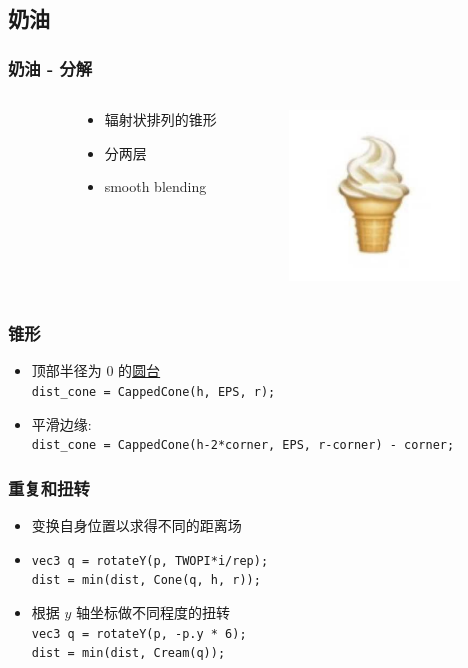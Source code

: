 \documentclass[aspectratio=169]{ctexbeamer} %
\begin{document}
\subsection{奶油}
\begin{frame}
    \frametitle{奶油 - 分解} %
    \begin{columns}
    \begin{column}{.1\textwidth}\end{column}
        \begin{column}{.4\textwidth}
            \begin{itemize}
                \item 辐射状排列的锥形
                \item 分两层
                \item smooth blending %
            \end{itemize}
        \end{column}
        \begin{column}{.5\textwidth}
            \includegraphics[width=128pt]{images/pre/emoji.pdf}
        \end{column}
    \end{columns}
\end{frame}
\begin{frame}
    \frametitle{锥形}
    \begin{itemize}
        \item 顶部半径为 0 的\underline{圆台} \\
        \texttt{dist\_cone = CappedCone(h, EPS, r);}
        \item 平滑边缘: \\
        \texttt{dist\_cone = CappedCone(h-2*corner, EPS, r-corner) - corner;}
    \end{itemize}
\end{frame}
\begin{frame}
    \frametitle{重复和扭转}
    \begin{itemize}
        \item 变换自身位置以求得不同的距离场
        \item \texttt{vec3 q = rotateY(p, TWOPI*i/rep);} \\ 
        \texttt{dist = min(dist, Cone(q, h, r));}
        \item 根据 $y$ 轴坐标做不同程度的扭转 \\
        \texttt{vec3 q = rotateY(p, -p.y * 6);} \\
        \texttt{dist = min(dist, Cream(q));}
    \end{itemize}
\end{frame}
\end{document}

